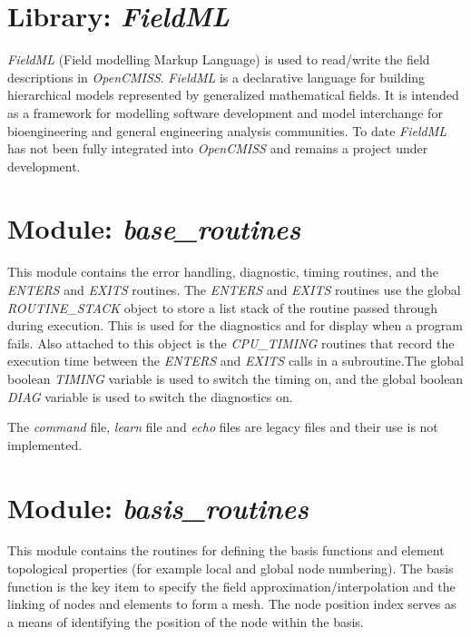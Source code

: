 \section{Library: \emph{FieldML}}
\label{sec:fieldml}

\emph{FieldML} (Field modelling Markup Language) is used to read/write the
field descriptions in \emph{OpenCMISS}. \emph{FieldML} is a declarative 
language for building hierarchical models represented by generalized 
mathematical fields. It is intended as a framework for modelling software 
development and model interchange for bioengineering and general 
engineering analysis communities. To date \emph{FieldML} has not been 
fully integrated into \emph{OpenCMISS} and remains a project under 
development.


\section{Module: \emph{base\_routines}}
\label{sec:baseroutines}

This module contains the error handling, diagnostic, timing routines, and 
the \emph{ENTERS} and \emph{EXITS} routines. The \emph{ENTERS} and 
\emph{EXITS} routines use the global \emph{ROUTINE\_STACK} object to store 
a list stack of the routine passed through during execution. This is used 
for the diagnostics and for display when a program fails. Also attached to 
this object is the \emph{CPU\_TIMING} routines that record the execution time 
between the \emph{ENTERS} and \emph{EXITS} calls in a subroutine.The global 
boolean \emph{TIMING} variable is used to switch the timing on, and the global 
boolean \emph{DIAG} variable is used to switch the diagnostics on. 

The \emph{command} file, \emph{learn} file and \emph{echo} files are legacy 
files and their use is not implemented.


\section{Module: \emph{basis\_routines}}
\label{sec:basisroutines}

This module contains the routines for defining the basis functions and element 
topological properties (for example local and global node numbering). The basis 
function is the key item to specify the field approximation/interpolation and 
the linking of nodes and elements to form a mesh. The node position index 
serves as a means of identifying the position of the node within the basis.

